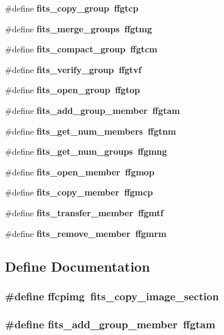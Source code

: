 \begin{CompactItemize}
\item 
\#define \bf{fits\_\-copy\_\-group}~ffgtcp
\item 
\#define \bf{fits\_\-merge\_\-groups}~ffgtmg
\item 
\#define \bf{fits\_\-compact\_\-group}~ffgtcm
\item 
\#define \bf{fits\_\-verify\_\-group}~ffgtvf
\item 
\#define \bf{fits\_\-open\_\-group}~ffgtop
\item 
\#define \bf{fits\_\-add\_\-group\_\-member}~ffgtam
\item 
\#define \bf{fits\_\-get\_\-num\_\-members}~ffgtnm
\item 
\#define \bf{fits\_\-get\_\-num\_\-groups}~ffgmng
\item 
\#define \bf{fits\_\-open\_\-member}~ffgmop
\item 
\#define \bf{fits\_\-copy\_\-member}~ffgmcp
\item 
\#define \bf{fits\_\-transfer\_\-member}~ffgmtf
\item 
\#define \bf{fits\_\-remove\_\-member}~ffgmrm
\end{CompactItemize}


\subsection{Define Documentation}
\subsubsection{\setlength{\rightskip}{0pt plus 5cm}\#define ffcpimg~fits\_\-copy\_\-image\_\-section}\label{test_2shm__client_2longnam_8h_421f404476b1124203a4959cfe5ffa55}


\subsubsection{\setlength{\rightskip}{0pt plus 5cm}\#define fits\_\-add\_\-group\_\-member~ffgtam}\label{test_2shm__client_2longnam_8h_77e070fc3e3583484c9ad06028fd414d}


